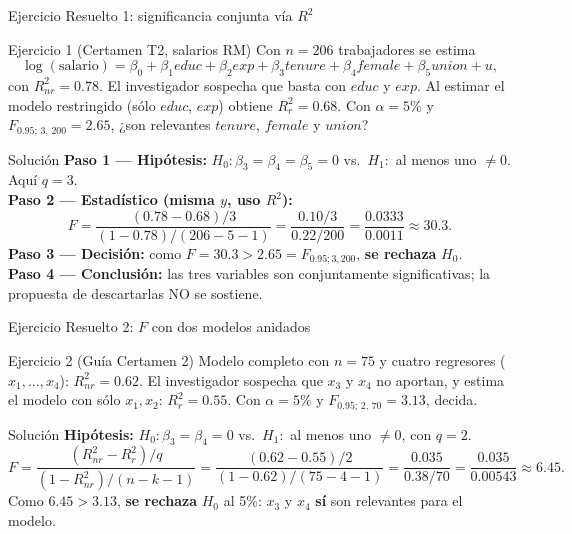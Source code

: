 \documentclass{beamer}
\begin{document}
\begin{frame}{Ejercicio Resuelto 1: significancia conjunta vía $R^2$}

\begin{block}{Ejercicio 1 (Certamen T2, salarios RM)}
Con $n = 206$ trabajadores se estima
\[
\log(\text{salario}) = \beta_0 + \beta_1 educ + \beta_2 exp + \beta_3 tenure + \beta_4 female + \beta_5 union + u,
\]
con $R^2_{nr} = 0.78$. El investigador sospecha que basta con $educ$ y $exp$. Al estimar el modelo restringido (sólo $educ$, $exp$) obtiene $R^2_r = 0.68$. Con $\alpha = 5\%$ y $F_{0.95;\,3,\,200} = 2.65$, ¿son relevantes $tenure$, $female$ y $union$?
\end{block}

\pause

\begin{exampleblock}{Solución}
\textbf{Paso 1 — Hipótesis:} $H_0: \beta_3=\beta_4=\beta_5=0$ vs.\ $H_1:$ al menos uno $\neq 0$. Aquí $q=3$.
\\
\textbf{Paso 2 — Estadístico (misma $y$, uso $R^2$):}
\[
F = \frac{(0.78-0.68)/3}{(1-0.78)/(206-5-1)} = \frac{0.10/3}{0.22/200} = \frac{0.0333}{0.0011} \approx 30.3.
\]
\textbf{Paso 3 — Decisión:} como $F = 30.3 > 2.65 = F_{0.95;3,200}$, \textbf{se rechaza} $H_0$.
\\
\textbf{Paso 4 — Conclusión:} las tres variables son conjuntamente significativas; la propuesta de descartarlas NO se sostiene.
\end{exampleblock}

\end{frame}

\begin{frame}{Ejercicio Resuelto 2: $F$ con dos modelos anidados}

\begin{block}{Ejercicio 2 (Guía Certamen 2)}
Modelo completo con $n=75$ y cuatro regresores ($x_1,\ldots,x_4$): $R^2_{nr}=0.62$. El investigador sospecha que $x_3$ y $x_4$ no aportan, y estima el modelo con sólo $x_1,x_2$: $R^2_r=0.55$. Con $\alpha=5\%$ y $F_{0.95;\,2,\,70}=3.13$, decida.
\end{block}

\pause

\begin{exampleblock}{Solución}
\textbf{Hipótesis:} $H_0:\beta_3=\beta_4=0$ vs.\ $H_1:$ al menos uno $\neq 0$, con $q=2$.
\[
F = \frac{(R^2_{nr}-R^2_r)/q}{(1-R^2_{nr})/(n-k-1)}
  = \frac{(0.62-0.55)/2}{(1-0.62)/(75-4-1)}
  = \frac{0.035}{0.38/70} = \frac{0.035}{0.00543} \approx 6.45.
\]
Como $6.45 > 3.13$, \textbf{se rechaza} $H_0$ al 5\%: $x_3$ y $x_4$ \textbf{sí} son relevantes para el modelo.
\end{exampleblock}

\end{frame}
\end{document}
